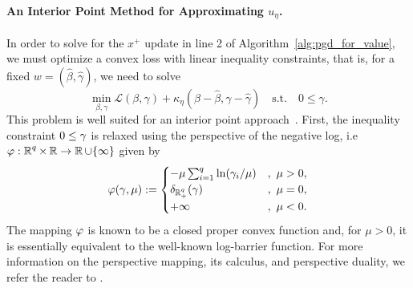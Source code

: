 
\paragraph{An Interior Point Method for Approximating $u_\eta$.}

In order to solve for the $x^+$ update in line 2 of Algorithm~\ref{alg:pgd_for_value}, we must optimize a convex loss with linear inequality constraints, that is, 
for a fixed $w = (\hat \beta, \hat \gamma)$, we need to solve 
\begin{equation}
\label{eq:ineqLoss}
\min_{\beta, \gamma} \mathcal{L}(\beta, \gamma) + \kappa_{\eta}(\beta - \hat \beta, \gamma - \hat \gamma) \quad \mbox{s.t.} \quad 0 \leq \gamma. 
\end{equation}
This problem is well suited for an interior point approach~\citep{Kojima1991,Nesterov1994,Wright1997}. 
First, the inequality constraint $0\le\gamma$ is relaxed
using the perspective of the negative log, i.e %
$\varphi:\operatorname{\mathbb{R}}^q\times\operatorname{\mathbb{R}}\rightarrow \operatorname{\mathbb{R}}\cup\{\infty\}$ given by
\[
\varphi(\gamma,\mu):=
\begin{cases}
-\mu\sum_{i=1}^q\ln (\gamma_i/\mu)&,\ \mu>0,\\
\delta_{\operatorname{\mathbb{R}}^q_+}(\gamma)&,\ \mu=0,\\
+\infty&,\ \mu<0.
\end{cases}
\]
The mapping $\varphi$ is known to be a closed proper convex function and, 
for $\mu>0$, it is
essentially equivalent to the well-known log-barrier function.
For more information on the perspective mapping, its calculus,
and perspective duality, we refer the reader to \cite{ABDFM18,ABF13}.
